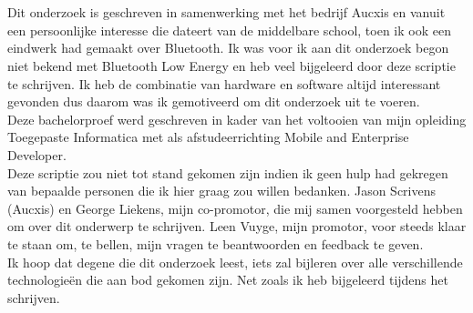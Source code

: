 
\chapter*{}%
\label{ch:voorwoord}

Dit onderzoek is geschreven in samenwerking met het bedrijf Aucxis en vanuit een persoonlijke interesse die dateert van de middelbare school, toen ik ook een eindwerk had gemaakt over Bluetooth. Ik was voor ik aan dit onderzoek begon niet bekend met Bluetooth Low Energy en heb veel bijgeleerd door deze scriptie te schrijven. Ik heb de combinatie van hardware en software altijd interessant gevonden dus daarom was ik gemotiveerd om dit onderzoek uit te voeren.\\

Deze bachelorproef werd geschreven in kader van het voltooien van mijn opleiding Toegepaste Informatica met als afstudeerrichting Mobile and Enterprise Developer.\\

Deze scriptie zou niet tot stand gekomen zijn indien ik geen hulp had gekregen van bepaalde personen die ik hier graag zou willen bedanken. Jason Scrivens (Aucxis) en George Liekens, mijn co-promotor, die mij samen voorgesteld hebben om over dit onderwerp te schrijven. Leen Vuyge, mijn promotor, voor steeds klaar te staan om, te bellen, mijn vragen te beantwoorden en feedback te geven.\\ 

Ik hoop dat degene die dit onderzoek leest, iets zal bijleren over alle verschillende technologieën die aan bod gekomen zijn. Net zoals ik heb bijgeleerd tijdens het schrijven. 